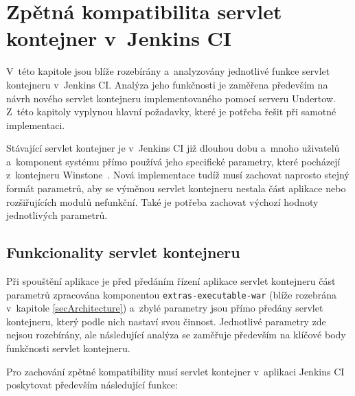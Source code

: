  


    \section{Zpětná kompatibilita servlet kontejner v~Jenkins CI}   \label{secKompatibilita}
        V~této kapitole jsou blíže rozebírány a~analyzovány jednotlivé funkce servlet
        kontejneru v~Jenkins CI. Analýza jeho funkčnosti je zaměřena především na 
        návrh nového servlet kontejneru implementovaného pomocí serveru Undertow.
        Z~této kapitoly vyplynou hlavní požadavky, které je potřeba řešit 
        při samotné implementaci.

        Stávající servlet kontejner je v~Jenkins CI již dlouhou dobu
        a~mnoho uživatelů a~komponent systému přímo používá jeho specifické
        parametry, které pocházejí z~kontejneru Winstone~\cite{kohsukeTopic}. Nová implementace
        tudíž musí zachovat naprosto stejný formát parametrů, aby 
        se výměnou servlet kontejneru nestala část aplikace nebo rozšiřujících modulů nefunkční.
        Také je potřeba zachovat výchozí hodnoty jednotlivých parametrů.

        \subsection{Funkcionality servlet kontejneru} \label{kapFunkcionality}
            Při spouštění aplikace je před předáním řízení aplikace servlet kontejneru
            část parametrů zpracována komponentou \texttt{extras-executable-war} (blíže 
            rozebrána v~kapitole \ref{secArchitecture}) a~zbylé parametry jsou přímo
            předány servlet kontejneru, který podle nich nastaví svou činnost.
            Jednotlivé parametry zde nejsou rozebírány, ale následující analýza
            se zaměřuje především na klíčové body funkčnosti servlet kontejneru.

            Pro zachování zpětné kompatibility musí servlet kontejner v~aplikaci 
            Jenkins CI poskytovat především následující funkce:
            
